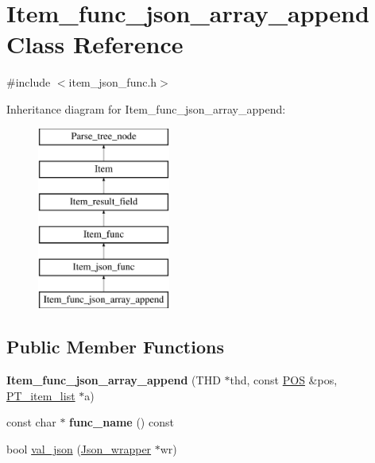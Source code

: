 \hypertarget{classItem__func__json__array__append}{}\section{Item\+\_\+func\+\_\+json\+\_\+array\+\_\+append Class Reference}
\label{classItem__func__json__array__append}


{\ttfamily \#include $<$item\+\_\+json\+\_\+func.\+h$>$}

Inheritance diagram for Item\+\_\+func\+\_\+json\+\_\+array\+\_\+append\+:\begin{figure}[H]
\begin{center}
\leavevmode
\includegraphics[height=6.000000cm]{classItem__func__json__array__append}
\end{center}
\end{figure}
\subsection*{Public Member Functions}
\begin{DoxyCompactItemize}
\item 
\mbox{\label{classItem__func__json__array__append_a1e2bd47038eceae307bd2f6c987c416d}} 
{\bfseries Item\+\_\+func\+\_\+json\+\_\+array\+\_\+append} (T\+HD $\ast$thd, const \mbox{\hyperlink{structYYLTYPE}{P\+OS}} \&pos, \mbox{\hyperlink{classPT__item__list}{P\+T\+\_\+item\+\_\+list}} $\ast$a)
\item 
\mbox{\label{classItem__func__json__array__append_ab8fc6dd2c7c2354c5fb920fffc29f1a9}} 
const char $\ast$ {\bfseries func\+\_\+name} () const
\item 
bool \mbox{\hyperlink{classItem__func__json__array__append_ae3826106cb02273f4e06a924b0dcb09c}{val\+\_\+json}} (\mbox{\hyperlink{classJson__wrapper}{Json\+\_\+wrapper}} $\ast$wr)
\end{DoxyCompactItemize}
